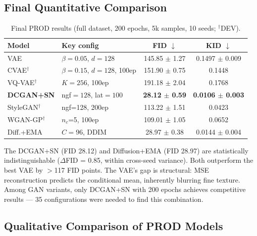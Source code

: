 \documentclass[runningheads]{llncs}
\begin{document}
\subsection{Final Quantitative Comparison}\label{sec:final}

\begin{table}[htbp]
\caption{Final PROD results (full dataset, 200 epochs, 5k samples, 10 seeds; $^\dagger$DEV).}\label{tab:main}
\centering
\begin{tabular}{llcc}
\toprule
Model & Key config & FID $\downarrow$ & KID $\downarrow$ \\
\midrule
VAE & $\beta{=}0.05$, $d{=}128$ & 145.85 $\pm$ 1.27 & 0.1497 $\pm$ 0.009 \\
CVAE$^\dagger$ & $\beta{=}0.15$, $d{=}128$, 100ep & 151.90 $\pm$ 0.75 & 0.1448 \\
VQ-VAE$^\dagger$ & $K{=}256$, 100ep & 191.18 $\pm$ 2.04 & 0.1768 \\
\midrule
\textbf{DCGAN+SN} & ngf${=}128$, lat${=}100$ & \textbf{28.12 $\pm$ 0.59} & \textbf{0.0106 $\pm$ 0.003} \\
StyleGAN$^\dagger$ & ngf=128, 200ep & 113.22 $\pm$ 1.51 & 0.0423 \\
WGAN-GP$^\dagger$ & $n_c$=5, 100ep & 109.01 $\pm$ 1.05 & 0.0652 \\
\midrule
Diff.+EMA & $C{=}96$, DDIM & 28.97 $\pm$ 0.38 & 0.0144 $\pm$ 0.004 \\
\bottomrule
\end{tabular}
\end{table}

The DCGAN+SN (FID 28.12) and Diffusion+EMA (FID 28.97) are statistically indistinguishable ($\Delta$FID = 0.85, within cross-seed variance). Both outperform the best VAE by $>$117 FID points. The VAE's gap is structural: MSE reconstruction predicts the conditional mean, inherently blurring fine texture. Among GAN variants, only DCGAN+SN with 200 epochs achieves competitive results --- 35 configurations were needed to find this combination.

\subsection{Qualitative Comparison of PROD Models}\label{sec:qualitative}

\end{document}
